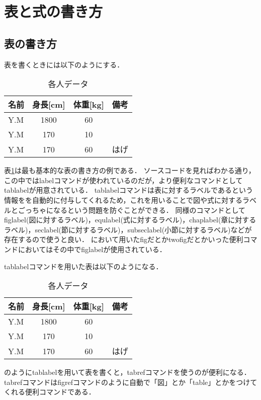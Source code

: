 \section{表と式の書き方}

\subsection{表の書き方}
表を書くときには以下のようにする．
\begin{table}[tb]
  \label{sample}
  \begin{center}
    \caption{各人データ}
    \begin{tabular}{l|c|c|r}
      \hline
      名前 & 身長[cm] & 体重[kg] & 備考 \\
      \hline
      Y.M & 1800 & 60 & \\
      Y.M & 170 & 10 & \\
      Y.M & 170 & 60 & はげ\\
      \hline
    \end{tabular}
  \end{center}
\end{table}
表\ref{sample}は最も基本的な表の書き方の例である．
ソースコードを見ればわかる通り，この中ではlabelコマンドが使われているのだが，より便利なコマンドとしてtablabelが用意されている．
tablabelコマンドは表に対するラベルであるという情報をを自動的に付与してくれるため，これを用いることで図や式に対するラベルとごっちゃになるという問題を防ぐことができる．
同様のコマンドとしてfiglabel(図に対するラベル)，equlabel(式に対するラベル)，chaplabel(章に対するラベル)，seclabel(節に対するラベル)，subseclabel(小節に対するラベル)などが存在するので使うと良い．
において用いたfigだとかtwofigだとかいった便利コマンドにおいてはその中でfiglabelが使用されている．

tablabelコマンドを用いた表は以下のようになる．
\begin{table}[tb]
  \begin{center}
    \caption{各人データ}
    \begin{tabular}{l|c|c|r}
      \hline
      名前 & 身長[cm] & 体重[kg] & 備考 \\
      \hline
      Y.M & 1800 & 60 & \\
      Y.M & 170 & 10 & \\
      Y.M & 170 & 60 & はげ\\
      \hline
    \end{tabular}
  \end{center}
\end{table}
のようにtablabelを用いて表を書くと，tabrefコマンドを使うのが便利になる．
tabrefコマンドはfigrefコマンドのように自動で「図」とか「table」とかをつけてくれる便利コマンドである．


